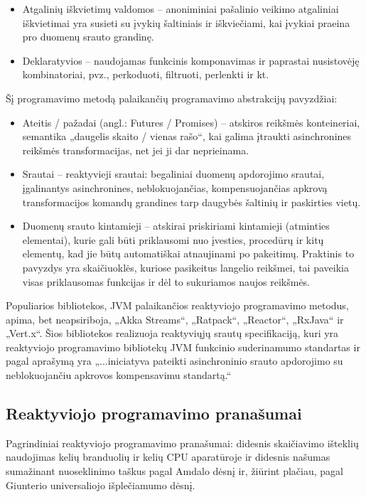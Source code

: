 \begin{itemize}
  \item Atgalinių iškvietimų valdomos – anoniminiai pašalinio veikimo atgaliniai iškvietimai yra susieti su įvykių šaltiniais ir iškviečiami, kai įvykiai praeina pro duomenų srauto grandinę.
  \item Deklaratyvios – naudojamas funkcinis komponavimas ir paprastai nusistovėję kombinatoriai, pvz., perkoduoti, filtruoti, perlenkti ir kt.
\end{itemize}

Šį programavimo metodą palaikančių programavimo abstrakcijų pavyzdžiai:

\begin{itemize}
  \item Ateitis / pažadai (angl.: Futures / Promises) – atskiros reikšmės konteineriai, semantika „daugelis skaito / vienas rašo“, kai galima įtraukti asinchronines reikšmės transformacijas, net jei ji dar neprieinama.
  \item Srautai – reaktyvieji srautai: begaliniai duomenų apdorojimo srautai, įgalinantys asinchronines, neblokuojančias, kompensuojančias apkrovą transformacijos komandų grandines tarp daugybės šaltinių ir paskirties vietų.
  \item Duomenų srauto kintamieji – atskirai priskiriami kintamieji (atminties elementai), kurie gali būti priklausomi nuo įvesties, procedūrų ir kitų elementų, kad jie būtų automatiškai atnaujinami po pakeitimų. Praktinis to pavyzdys yra skaičiuoklės, kuriose pasikeitus langelio reikšmei, tai paveikia visas priklausomas funkcijas ir dėl to sukuriamos naujos reikšmės.
\end{itemize}

Populiarios bibliotekos, JVM palaikančios reaktyviojo programavimo metodus, apima, bet neapsiriboja, „Akka Streams“, „Ratpack“, „Reactor“, „RxJava“ ir „Vert.x“. Šios bibliotekos realizuoja reaktyviųjų srautų specifikaciją, kuri yra reaktyviojo programavimo bibliotekų JVM funkcinio suderinamumo standartas ir pagal aprašymą yra „...iniciatyva pateikti asinchroninio srauto apdorojimo su neblokuojančiu apkrovos kompensavimu standartą.“

\subsection{Reaktyviojo programavimo pranašumai}

Pagrindiniai reaktyviojo programavimo pranašumai: didesnis skaičiavimo išteklių naudojimas kelių branduolių ir kelių CPU aparatūroje ir didesnis našumas sumažinant nuoseklinimo taškus pagal Amdalo dėsnį ir, žiūrint plačiau, pagal Giunterio universaliojo išplečiamumo dėsnį.

